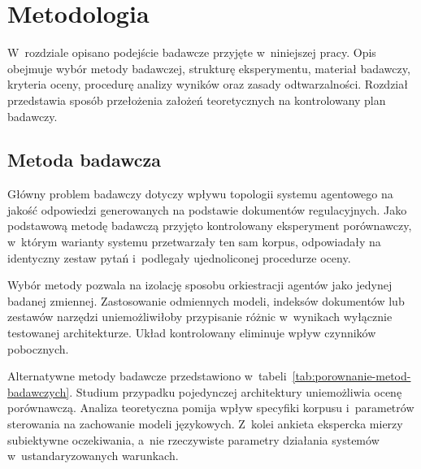 \chapter{Metodologia}\label{chap:metodologia}

W~rozdziale opisano podejście badawcze przyjęte w~niniejszej pracy. Opis
obejmuje wybór metody badawczej, strukturę eksperymentu, materiał badawczy,
kryteria oceny, procedurę analizy wyników oraz zasady odtwarzalności. Rozdział
przedstawia sposób przełożenia założeń teoretycznych na kontrolowany plan
badawczy.

\section{Metoda badawcza}\label{sec:metoda-badawcza}

Główny problem badawczy dotyczy wpływu topologii systemu agentowego na jakość
odpowiedzi generowanych na podstawie dokumentów regulacyjnych. Jako podstawową
metodę badawczą przyjęto kontrolowany eksperyment porównawczy, w~którym
warianty systemu przetwarzały ten sam korpus, odpowiadały na identyczny zestaw
pytań i~podlegały ujednoliconej procedurze oceny.

Wybór metody pozwala na izolację sposobu orkiestracji agentów jako jedynej
badanej zmiennej. Zastosowanie odmiennych modeli, indeksów dokumentów lub
zestawów narzędzi uniemożliwiłoby przypisanie różnic w~wynikach wyłącznie
testowanej architekturze. Układ kontrolowany eliminuje wpływ czynników
pobocznych.

Alternatywne metody badawcze przedstawiono
w~tabeli~\ref{tab:porownanie-metod-badawczych}. Studium przypadku pojedynczej
architektury uniemożliwia ocenę porównawczą. Analiza teoretyczna pomija wpływ
specyfiki korpusu i~parametrów sterowania na zachowanie modeli językowych.
Z~kolei ankieta ekspercka mierzy subiektywne oczekiwania, a~nie rzeczywiste
parametry działania systemów w~ustandaryzowanych warunkach.

